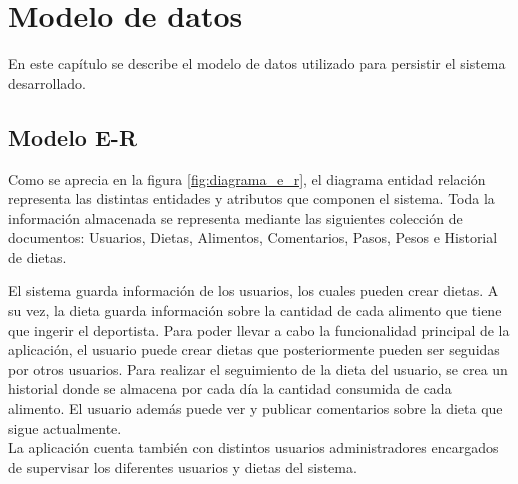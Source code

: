 \chapter{Modelo de datos}
En este capítulo se describe el modelo de datos utilizado para persistir el sistema desarrollado.

\section{Modelo E-R}



Como se aprecia en la figura \ref{fig:diagrama_e_r}, el diagrama entidad relación representa las distintas entidades y atributos que componen el sistema. Toda la información almacenada se representa mediante las siguientes colección de documentos: Usuarios, Dietas, Alimentos, Comentarios, Pasos, Pesos e Historial de dietas.

El sistema guarda información de los usuarios, los cuales pueden crear dietas. A su vez, la dieta guarda información sobre la cantidad de cada alimento que tiene que ingerir el deportista. Para poder llevar a cabo la funcionalidad principal de la aplicación, el usuario puede crear dietas que posteriormente pueden ser seguidas por otros usuarios. Para realizar el seguimiento de la dieta del usuario, se crea un historial donde se almacena por cada día la cantidad consumida de cada alimento. El usuario además puede ver y publicar comentarios sobre la dieta que sigue actualmente.\\
La aplicación cuenta también con distintos usuarios administradores encargados de supervisar los diferentes usuarios y dietas del sistema.

